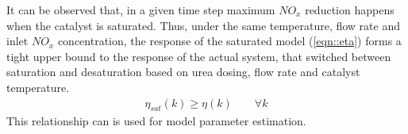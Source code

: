 It can be observed that, in a given time step maximum $NO_x$ reduction happens when the catalyst is saturated. Thus,
under the same temperature, flow rate and inlet $NO_x$ concentration, the response of the saturated model
(\ref{eqn::eta}) forms a tight upper bound to the response of the actual system, that switched between saturation and
desaturation based on urea dosing, flow rate and catalyst temperature.
\begin{align}
        \eta_{sat}(k) \geq \eta(k) \qquad \forall k
        \label{eqn::eta_bound}
\end{align}
This relationship can is used for model parameter estimation.
